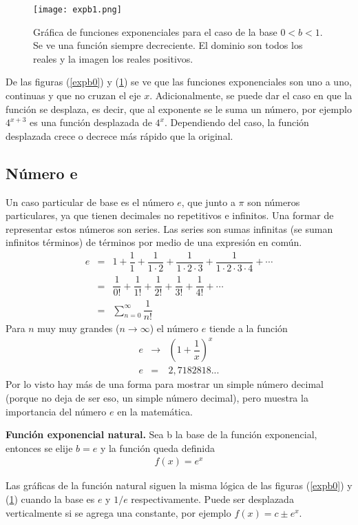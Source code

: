  \begin{center}
\begin{figure}[h!]
\centering
\texttt{[image: expb1.png]}
\caption[Gráfica de funciones exponenciales para el caso de la base $0<b<1$]{Gráfica de funciones exponenciales para el caso de la base $0<b<1$. Se ve una función siempre decreciente. El dominio son todos los reales y la imagen los reales positivos.} \label{expb1}
\end{figure}
\end{center}

De las figuras (\ref{expb0}) y (\ref{expb1}) se ve que las funciones exponenciales son uno a uno, continuas y que no cruzan el eje $x$. Adicionalmente, se puede dar el caso en que la función se desplaza, es decir, que al exponente se le suma un número, por ejemplo $4^{x+3}$ es una función desplazada de $4^{x}$. Dependiendo del caso, la función desplazada crece o decrece más rápido que la original.
\newpage
\subsection{Número e}

Un caso particular de base es el número $e$, que junto a $\pi$ son números particulares, ya que tienen decimales no repetitivos e infinitos. Una formar de representar estos números son series. Las series son sumas infinitas (se suman infinitos términos) de términos por medio de una expresión en común. 
\begin{eqnarray*}
e&=&1 + \dfrac{1}{1} + \dfrac{1}{1\cdot 2} + \dfrac{1}{1\cdot 2\cdot 3} + \dfrac{1}{1\cdot 2\cdot 3\cdot 4}+\cdots \\
&=&\dfrac{1}{0!} + \dfrac{1}{1!} + \dfrac{1}{ 2!} + \dfrac{1}{3!} + \dfrac{1}{4!}+\cdots \\
&=&\sum_{n=0}^{\infty}\dfrac{1}{n!}
\end{eqnarray*}
Para $n$ muy muy grandes ($n\rightarrow \infty$) el número $e$ tiende a la función
\begin{eqnarray*}
e&\rightarrow &\left(1+\dfrac{1}{x}\right)^{x} \\
e&=&2,7182818...
\end{eqnarray*} 
Por lo visto hay más de una forma para mostrar un simple número decimal (porque no deja de ser eso, un simple número decimal), pero muestra la importancia del número $e$ en la matemática.

\begin{mydef}
\textbf{Función exponencial natural. } Sea b la base de la función exponencial, entonces se elije $b=e$ y la función queda definida
\begin{eqnarray}
f(x)=e^{x}
\end{eqnarray}
\end{mydef}
Las gráficas de la función natural siguen la misma lógica de las figuras (\ref{expb0}) y (\ref{expb1}) cuando la base es $e$ y $1/e$ respectivamente. Puede ser desplazada verticalmente si se agrega una constante, por ejemplo $f(x)=c\pm e^{x}$.

